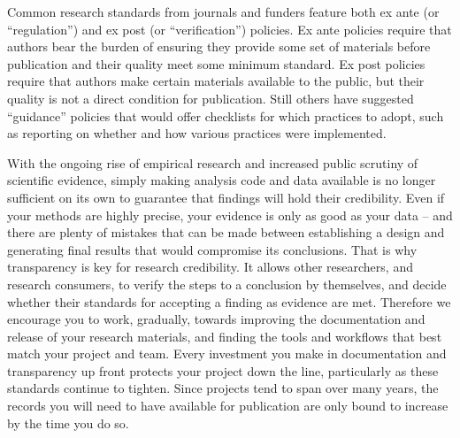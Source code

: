 Common research standards from journals and funders feature both ex ante
(or ``regulation'') and ex post (or ``verification'') policies.\cite{stodden2013toward}
Ex ante policies require that authors bear the burden
of ensuring they provide some set of materials before publication
and their quality meet some minimum standard.
Ex post policies require that authors make certain materials available to the public,
but their quality is not a direct condition for publication.
Still others have suggested ``guidance'' policies that would offer checklists
for which practices to adopt, such as reporting on whether and how
various practices were implemented.\cite{nosek2015promoting}

With the ongoing rise of empirical research and increased public scrutiny of scientific evidence,
simply making analysis code and data available
is no longer sufficient on its own to guarantee that findings will hold their credibility.
Even if your methods are highly precise,
your evidence is only as good as your data --
and there are plenty of mistakes that can be made between
establishing a design and generating final results that would compromise its conclusions.
That is why transparency is key for research credibility.
It allows other researchers, and research consumers,
to verify the steps to a conclusion by themselves,
and decide whether their standards for accepting a finding as evidence are met.
Therefore we encourage you to work, gradually, towards improving
the documentation and release of your research materials,
and finding the tools and workflows that best match your project and team.
Every investment you make in documentation and transparency up front
protects your project down the line, particularly as these standards continue to tighten.
Since projects tend to span over many years,
the records you will need to have available for publication are
only bound to increase by the time you do so.
